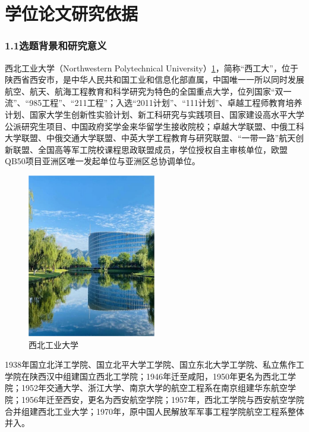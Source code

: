 \documentclass{article}
\begin{document}
\section{学位论文研究依据}
\subsubsection*{1.1选题背景和研究意义}
西北工业大学（Northwestern Polytechnical University）\ref{Fig. 1}，简称“西工大”，位于陕西省西安市，是中华人民共和国工业和信息化部直属，中国唯一一所以同时发展航空、航天、航海工程教育和科学研究为特色的全国重点大学，位列国家“双一流”、“985工程”、“211工程”；入选“2011计划”、“111计划”、卓越工程师教育培养计划、国家大学生创新性实验计划、新工科研究与实践项目、国家建设高水平大学公派研究生项目、中国政府奖学金来华留学生接收院校；卓越大学联盟、中俄工科大学联盟、中俄交通大学联盟、中英大学工程教育与研究联盟、“一带一路”航天创新联盟、全国高等军工院校课程思政联盟成员，学位授权自主审核单位，欧盟QB50项目亚洲区唯一发起单位与亚洲区总协调单位。 

\begin{figure}[h!]
	\centering
	\includegraphics[width=0.5\textwidth]{figure/fig_1.pdf}
	\caption{\kaishu 西北工业大学}
	\label{Fig. 1}
\end{figure}
\vspace{-0.2cm}


1938年国立北洋工学院、国立北平大学工学院、国立东北大学工学院、私立焦作工学院在陕西汉中组建国立西北工学院；1946年迁至咸阳，1950年更名为西北工学院；1952年交通大学、浙江大学、南京大学的航空工程系在南京组建华东航空学院；1956年迁至西安，更名为西安航空学院；1957年，西北工学院与西安航空学院合并组建西北工业大学；1970年，原中国人民解放军军事工程学院航空工程系整体并入。
\end{document}
